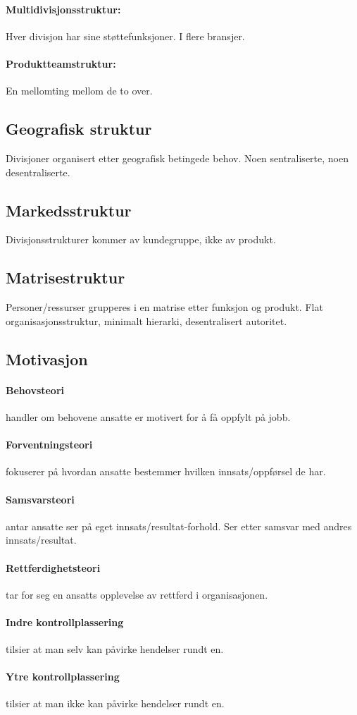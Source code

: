 \documentclass[a4paper]{article}
\begin{document}
\paragraph{Multidivisjonsstruktur:} Hver divisjon har sine støttefunksjoner. I flere bransjer.
\paragraph{Produktteamstruktur:} En mellomting mellom de to over.

\subsection{Geografisk struktur}
Divisjoner organisert etter geografisk betingede behov. Noen sentraliserte, noen desentraliserte.

\subsection{Markedsstruktur}
Divisjonsstrukturer kommer av kundegruppe, ikke av produkt.

\subsection{Matrisestruktur}
Personer/ressurser grupperes i en matrise etter funksjon og produkt. Flat organisasjonsstruktur, minimalt hierarki, desentralisert autoritet.

\subsection{Motivasjon}
\paragraph{Behovsteori} handler om behovene ansatte er motivert for å få oppfylt på jobb.
\paragraph{Forventningsteori} fokuserer på hvordan ansatte bestemmer hvilken innsats/oppførsel de har.
\paragraph{Samsvarsteori} antar ansatte ser på eget innsats/resultat-forhold. Ser etter samsvar med andres innsats/resultat.
\paragraph{Rettferdighetsteori} tar for seg en ansatts opplevelse av rettferd i organisasjonen.
\paragraph{Indre kontrollplassering} tilsier at man selv kan påvirke hendelser rundt en.
\paragraph{Ytre kontrollplassering} tilsier at man ikke kan påvirke hendelser rundt en.
\end{document}
